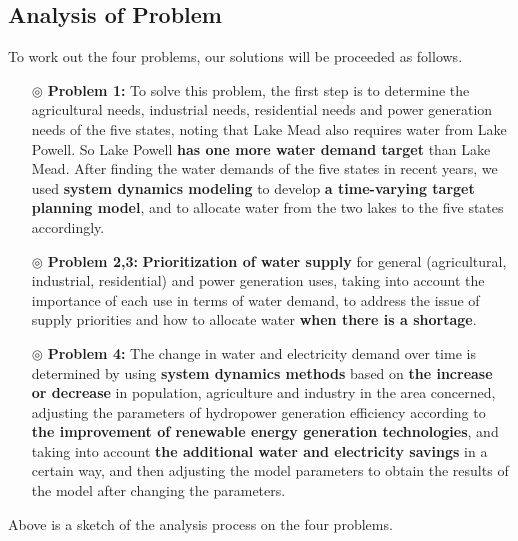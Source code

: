 \subsection{Analysis of Problem}
To work out the four problems, our solutions will be proceeded as follows.
\begin{itemize}
  \item[$\circledcirc$] \textbf{Problem 1:} To solve this problem, the first step is to determine the agricultural needs, industrial needs, residential needs and power generation needs of the five states, noting that Lake Mead also requires water from Lake Powell. So Lake Powell \textbf{has one more water demand target} than Lake Mead. After finding the water demands of the five states in recent years, we used \textbf{system dynamics modeling} to develop \textbf{a time-varying target planning model}, and to allocate water from the two lakes to the five states accordingly.
  \item[$\circledcirc$] \textbf{Problem 2,3:} \textbf{Prioritization of water supply} for general (agricultural, industrial, residential) and power generation uses, taking into account the importance of each use in terms of water demand, to address the issue of supply priorities and how to allocate water \textbf{when there is a shortage}.
  \item[$\circledcirc$] \textbf{Problem 4:} The change in water and electricity demand over time is determined by using \textbf{system dynamics methods} based on \textbf{the increase or decrease} in population, agriculture and industry in the area concerned, adjusting the parameters of hydropower generation efficiency according to \textbf{the improvement of renewable energy generation technologies}, and taking into account \textbf{the additional water and electricity savings} in a certain way, and then adjusting the model parameters to obtain the results of the model after changing the parameters.
\end{itemize}
\par
Above is a sketch of the analysis process on the four problems.